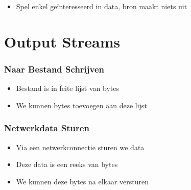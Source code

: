 \documentclass[dutch]{ucll-slides}
\begin{document}
\begin{frame}
\begin{center}
  \end{center}
  \begin{itemize}
    \item Spel enkel ge\"interesseerd in data, bron maakt niets uit
  \end{itemize}
\end{frame}

\section{Output Streams}

\frame{\tableofcontents[currentsection]}

\begin{frame}
  \frametitle{Naar Bestand Schrijven}
  \begin{itemize}
    \item Bestand is in feite lijst van bytes
    \item We kunnen bytes toevoegen aan deze lijst
  \end{itemize}
\end{frame}

\begin{frame}
  \frametitle{Netwerkdata Sturen}
  \begin{itemize}
    \item Via een netwerkconnectie sturen we data
    \item Deze data is een reeks van bytes
    \item We kunnen deze bytes na elkaar versturen
  \end{itemize}
\end{frame}
\end{document}
